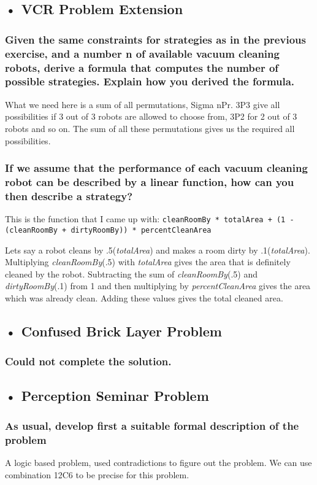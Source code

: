 \documentclass[a4paper,12pt]{article}
\begin{document}
\subsection*{• VCR Problem Extension}
\subsubsection*{Given the same constraints for strategies as in the previous exercise, and a number n of
available vacuum cleaning robots, derive a formula that computes the number of possible
strategies. Explain how you derived the formula.}
What we need here is a sum of all permutations, Sigma nPr. 
3P3 give all possibilities if 3 out of 3 robots are allowed to choose from,
3P2 for 2 out of 3 robots and so on. The sum of all these permutations gives us the required all possibilities.

\subsubsection*{If we assume that the performance of each vacuum cleaning robot can be described by a
linear function, how can you then describe a strategy?}
This is the function that I came up with:
\newline
{\tt cleanRoomBy * totalArea + (1 - (cleanRoomBy + dirtyRoomBy)) * percentCleanArea}

Lets say a robot cleans by .5(\textit{totalArea}) and makes a room dirty by .1(\textit{totalArea}).
Multiplying \textit{cleanRoomBy}(.5) with \textit{totalArea} gives the area that is definitely cleaned by the robot.
Subtracting the sum of \textit{cleanRoomBy}(.5) and \textit{dirtyRoomBy}(.1) from 1 and then multiplying by \textit{percentCleanArea} gives the area 
which was already clean. Adding these values gives the total cleaned area.
\subsection*{• Confused Brick Layer Problem}
\subsubsection*{Could not complete the solution.}

\subsection*{• Perception Seminar Problem}
\subsubsection*{As usual, develop first a suitable formal description of the problem}
A logic based problem, used contradictions to figure out the problem. We can use combination 12C6 to be precise for this problem.
\end{document}
